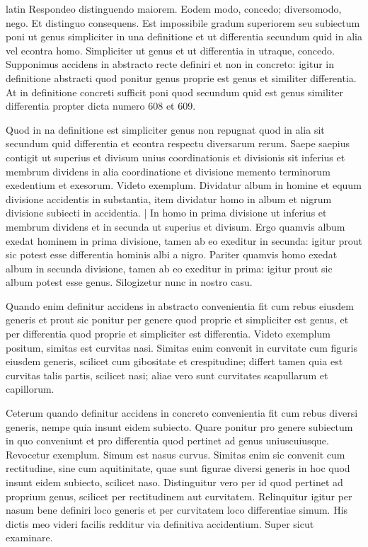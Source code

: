 \begin{otherlanguage*}{latin}
\pstart
  Respondeo distinguendo maiorem. Eodem modo, concedo; diversomodo, nego. Et distinguo consequens. Est impossibile gradum superiorem seu subiectum poni ut genus simpliciter in una definitione et ut differentia secundum quid in alia vel econtra homo. Simpliciter ut genus et ut differentia in utraque, concedo. Supponimus accidens in abstracto recte definiri et non in concreto: igitur in definitione abstracti quod ponitur genus proprie est genus et similiter differentia. At in definitione concreti sufficit poni quod secundum quid est genus similiter differentia propter dicta numero 608 et 609. 
\pend

\pstart
  Quod in na definitione est simpliciter genus non repugnat quod in alia sit secundum quid differentia et econtra respectu diversarum rerum. Saepe saepius contigit ut superius et divisum unius coordinationis et divisionis sit inferius et membrum dividens in alia coordinatione et divisione memento terminorum exedentium et exesorum. Videto exemplum. Dividatur album in homine et equum divisione accidentis in substantia, item dividatur homo in album et nigrum divisione subiecti in accidentia. \textnormal{|}   In homo in prima divisione ut inferius et membrum dividens et in secunda ut superius et divisum. Ergo quamvis album exedat hominem in prima divisione, tamen ab eo exeditur in secunda: igitur prout sic potest esse differentia hominis albi a nigro. Pariter quamvis homo exedat album in secunda divisione, tamen ab eo exeditur in prima: igitur prout sic album potest esse genus. Silogizetur nunc in nostro casu. 
\pend

\pstart
  Quando enim definitur accidens in abstracto convenientia fit cum rebus eiusdem generis et prout sic ponitur per genere quod proprie et simpliciter est genus, et per differentia quod proprie et simpliciter est differentia. Videto exemplum positum, simitas est curvitas nasi. Simitas enim convenit in curvitate cum figuris eiusdem generis, scilicet cum gibositate et crespitudine; differt tamen quia est curvitas talis partis, scilicet nasi; aliae vero sunt curvitates scapullarum et capillorum. 
\pend

\pstart
  Ceterum quando definitur accidens in concreto convenientia fit cum rebus diversi generis, nempe quia insunt eidem subiecto. Quare ponitur pro genere subiectum in quo conveniunt et pro differentia quod pertinet ad genus uniuscuiusque. Revocetur exemplum. Simum est nasus curvus. Simitas enim sic convenit cum rectitudine, sine cum aquitinitate, quae sunt figurae diversi generis in hoc quod insunt eidem subiecto, scilicet naso. Distinguitur vero per id quod pertinet ad proprium genus, scilicet per rectitudinem aut curvitatem. Relinquitur igitur per nasum bene definiri loco generis et per curvitatem loco differentiae simum. His dictis meo videri facilis redditur via definitiva accidentium. Super sicut examinare. 
\pend


\end{otherlanguage*}
